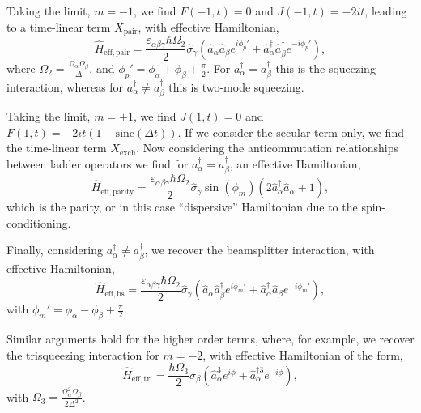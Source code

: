     Taking the limit, $m=-1$, we find $F(-1,t)=0$ and $J(-1,t) = -2it$, leading to a time-linear term $X_\mathrm{pair}$,
    with effective Hamiltonian,
    \begin{equation}
        \hat H_\mathrm{eff, pair} = \frac{\varepsilon_{\alpha\beta\gamma}\hbar \Omega_2}{2}\hat\sigma_\gamma\left(\hat a_\alpha \hat a_\beta e^{i\phi_p'}+\hat a_\alpha^\dagger \hat a_\beta^\dagger e^{-i\phi_p'}\right),
    \end{equation}
    where $\Omega_2 = \frac{\Omega_\alpha\Omega_\beta}{\Delta}$, and $\phi_p' = \phi_\alpha +\phi_\beta + \frac{\pi}{2}$. For $a_\alpha^\dagger = a_\beta^\dagger$ this is the squeezing interaction, whereas for $a_\alpha^\dagger \neq a_\beta^\dagger$ this is two-mode squeezing.

    Taking the limit, $m=+1$, we find $J(1,t)=0$ and $F(1,t) = -2it\left(1-\mathrm{sinc}(\Delta t)\right)$. If we consider the secular term only, we find the time-linear term $X_\mathrm{exch}$. Now considering the anticommutation relationships between ladder operators we find for $a_\alpha^\dagger = a_\beta^\dagger$, an effective Hamiltonian,
    \begin{equation}
        \hat H_\mathrm{eff, parity} = \frac{\varepsilon_{\alpha\beta\gamma}\hbar \Omega_2}{2}\hat\sigma_\gamma\sin(\phi_m) (2\hat a_\alpha^\dagger \hat a_\alpha +1),
    \end{equation}
    which is the parity, or in this case ``dispersive'' Hamiltonian due to the spin-conditioning.

    Finally, considering $a_\alpha^\dagger \neq a_\beta^\dagger$, we recover the beamsplitter interaction, with effective Hamiltonian,
    \begin{equation}
        \hat H_\mathrm{eff, bs} = \frac{\varepsilon_{\alpha\beta\gamma}\hbar \Omega_2}{2}\hat\sigma_\gamma \left(\hat a_\alpha \hat a_\beta^\dagger e^{i\phi_m'}+\hat a_\alpha^\dagger \hat a_\beta e^{-i\phi_m'}\right),
    \end{equation}
    with $\phi_m' = \phi_\alpha - \phi_\beta + \frac{\pi}{2}$.

    Similar arguments hold for the higher order terms, where, for example, we recover the trisqueezing interaction for $m=-2$, with effective Hamiltonian of the form,
    \begin{equation}
        \hat H_\mathrm{eff, tri} = \frac{\hbar \Omega_3}{2}\hat\sigma_\beta \left(\hat a_\alpha^3 e^{i\phi}+\hat a_\alpha^{\dagger 3}  e^{-i\phi}\right),
    \end{equation}
    with $\Omega_3 = \frac{\Omega_\alpha^2\Omega_\beta}{2\Delta^2}$.


